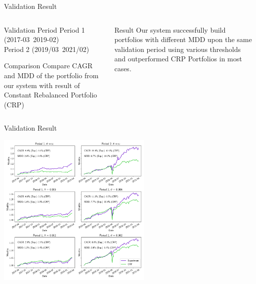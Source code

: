 \begin{frame}{Validation Result}

\begin{columns}[t]
\begin{column}{0.5\textwidth}
\begin{block}{Validation Period}
Period 1 (2017-03~2019-02) 
\\
Period 2 (2019/03~2021/02)
\end{block}
\begin{block}{Comparison}
Compare CAGR and MDD of the portfolio from our system with result of Constant Rebalanced Portfolio (CRP)
\end{block}
\end{column}

\begin{column}{0.5\textwidth}
\begin{block}{Result}
Our system successfully build portfolios with different MDD upon the same validation period using various thresholds and outperformed CRP Portfolios in most cases.
\end{block}
\end{column}
\end{columns}
\end{frame}

\begin{frame}{Validation Result}
\begin{center}
\includegraphics[height= 7.5cm]{images/crp_compare.png}
\end{center}

\end{frame}
